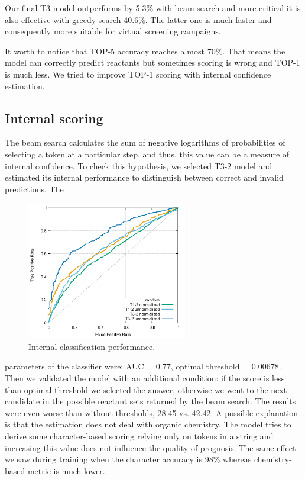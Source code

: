 \documentclass{article}
\begin{document}
Our final T3 model outperforms \cite{Pande} by 5.3\% with beam search and more critical it is also effective with greedy search 40.6\%. The latter one is much faster and consequently more suitable for virtual screening campaigns. 

It worth to notice that TOP-5 accuracy reaches almost 70\%. That means the model can correctly predict reactants but sometimes scoring is wrong and TOP-1 is much less. We tried to improve TOP-1 scoring with internal confidence estimation. 

\subsection{Internal scoring}

The beam search calculates the sum of negative logarithms of probabilities of selecting a token at a particular step, and thus, this value can be a measure of internal confidence. To check this hypothesis, we selected T3-2 model and estimated its internal performance to distinguish between correct and invalid predictions.  The \begin{figure}  
  \vspace{-0.2cm}
  \includegraphics[width = 7cm]{images/auc.pdf}
  \caption{Internal classification performance.}
  \label{fig:auc}
  \vspace{-0.2cm}
\end{figure}parameters of the classifier were: AUC = 0.77, optimal threshold = 0.00678. Then we validated the model with an additional condition: if the score is less than optimal threshold we selected the answer, otherwise  we went to the next candidate in the possible reactant sets returned by the beam search. The results were even worse than without thresholds, 28.45 vs. 42.42.   A possible explanation is that the estimation does not deal with organic chemistry. The model tries to derive some character-based scoring relying only on tokens in a string and increasing this value does not influence the quality of prognosis. The same effect we saw during training when the character accuracy is 98\% whereas chemistry-based metric is much lower. 
 
\end{document}
